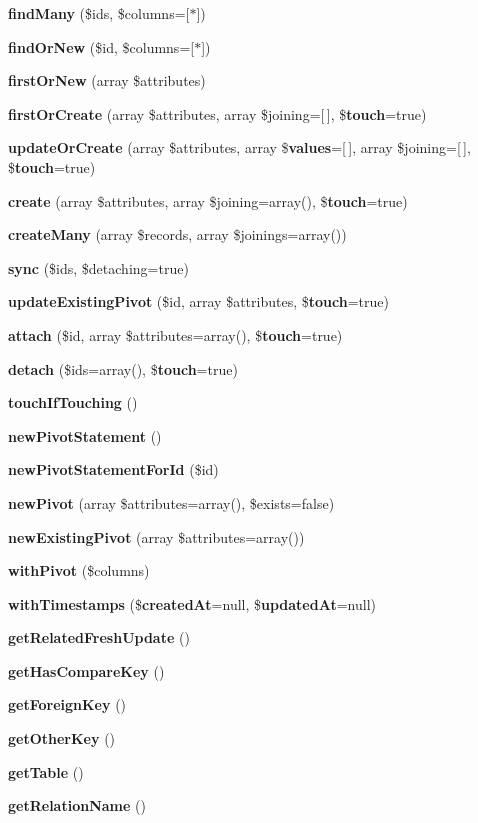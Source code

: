 \begin{DoxyCompactItemize}
{\bf find\+Many} (\$ids, \$columns=[\textquotesingle{}$\ast$\textquotesingle{}])
\item 
{\bf find\+Or\+New} (\$id, \$columns=[\textquotesingle{}$\ast$\textquotesingle{}])
\item 
{\bf first\+Or\+New} (array \$attributes)
\item 
{\bf first\+Or\+Create} (array \$attributes, array \$joining=[$\,$], \${\bf touch}=true)
\item 
{\bf update\+Or\+Create} (array \$attributes, array \${\bf values}=[$\,$], array \$joining=[$\,$], \${\bf touch}=true)
\item 
{\bf create} (array \$attributes, array \$joining=array(), \${\bf touch}=true)
\item 
{\bf create\+Many} (array \$records, array \$joinings=array())
\item 
{\bf sync} (\$ids, \$detaching=true)
\item 
{\bf update\+Existing\+Pivot} (\$id, array \$attributes, \${\bf touch}=true)
\item 
{\bf attach} (\$id, array \$attributes=array(), \${\bf touch}=true)
\item 
{\bf detach} (\$ids=array(), \${\bf touch}=true)
\item 
{\bf touch\+If\+Touching} ()
\item 
{\bf new\+Pivot\+Statement} ()
\item 
{\bf new\+Pivot\+Statement\+For\+Id} (\$id)
\item 
{\bf new\+Pivot} (array \$attributes=array(), \$exists=false)
\item 
{\bf new\+Existing\+Pivot} (array \$attributes=array())
\item 
{\bf with\+Pivot} (\$columns)
\item 
{\bf with\+Timestamps} (\${\bf created\+At}=null, \${\bf updated\+At}=null)
\item 
{\bf get\+Related\+Fresh\+Update} ()
\item 
{\bf get\+Has\+Compare\+Key} ()
\item 
{\bf get\+Foreign\+Key} ()
\item 
{\bf get\+Other\+Key} ()
\item 
{\bf get\+Table} ()
\item 
{\bf get\+Relation\+Name} ()
\end{DoxyCompactItemize}
